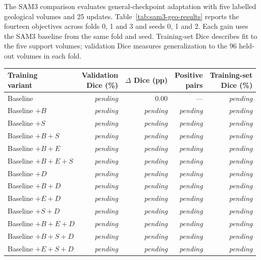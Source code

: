 \documentclass[12pt,a4paper]{article}
\newcommand{\samPending}{\textit{pending}}
\begin{document}
The SAM3 comparison evaluates general-checkpoint adaptation with five
labelled geological volumes and 25 updates. Table~\ref{tab:sam3-geo-results}
reports the fourteen objectives across folds 0, 1 and 3 and seeds 0, 1
and 2. Each gain uses the SAM3 baseline from the same fold and seed.
Training-set Dice describes fit to the five support volumes; validation
Dice measures generalization to the 96 held-out volumes in each fold.

\begin{table}[htbp]
\centering\small{}
\setlength{\tabcolsep}{6pt}
\renewcommand{\arraystretch}{1.12}
\begin{tabular}{@{}lrrrr@{}}
\hline
\shortstack{Training\\variant} & \shortstack{Validation\\Dice (\%)} & \shortstack{$\Delta$ Dice\\(pp)} & \shortstack{Positive\\pairs} & \shortstack{Training-set\\Dice (\%)} \\
\hline
Baseline & \samPending & 0.00 & --- & \samPending \\
Baseline $+B$ & \samPending & \samPending & \samPending & \samPending \\
Baseline $+S$ & \samPending & \samPending & \samPending & \samPending \\
Baseline $+B+S$ & \samPending & \samPending & \samPending & \samPending \\
Baseline $+B+E$ & \samPending & \samPending & \samPending & \samPending \\
Baseline $+B+E+S$ & \samPending & \samPending & \samPending & \samPending \\
Baseline $+D$ & \samPending & \samPending & \samPending & \samPending \\
Baseline $+B+D$ & \samPending & \samPending & \samPending & \samPending \\
Baseline $+E+D$ & \samPending & \samPending & \samPending & \samPending \\
Baseline $+S+D$ & \samPending & \samPending & \samPending & \samPending \\
Baseline $+B+E+D$ & \samPending & \samPending & \samPending & \samPending \\
Baseline $+B+S+D$ & \samPending & \samPending & \samPending & \samPending \\
Baseline $+E+S+D$ & \samPending & \samPending & \samPending & \samPending \\

\end{tabular}
\end{table}
\end{document}
